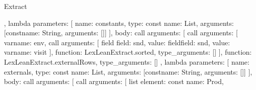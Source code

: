 \begin{lexlean}{Extract}
\begin{toolingmodule}
{{{{{{{{{{{{                                  },
                                  lambda{
                                    parameters: [
                                      {
                                        name: constants,
                                        type: const{
                                          name: List,
                                          arguments: [const{name: String, arguments: []}]
                                        }
                                      }
                                    ],
                                    body: call{
                                      arguments: [
                                        call{
                                          arguments: [
                                            var{name: env},
                                            call{
                                              arguments: [
                                                field{
                                                  field: snd,
                                                  value: field{field: snd, value: var{name: visit}}
                                                }
                                              ],
                                              function: LexLeanExtract.sorted,
                                              type_arguments: []
                                            }
                                          ],
                                          function: LexLeanExtract.externalRows,
                                          type_arguments: []
                                        },
                                        lambda{
                                          parameters: [
                                            {
                                              name: externals,
                                              type: const{
                                                name: List,
                                                arguments: [const{name: String, arguments: []}]
                                              }
                                            }
                                          ],
                                          body: call{
                                            arguments: [
                                              call{
                                                arguments: [
                                                  list{
                                                    element: const{
                                                      name: Prod,
}}}}}}}}}}}}}}}}}}
\end{toolingmodule}
\end{lexlean}

